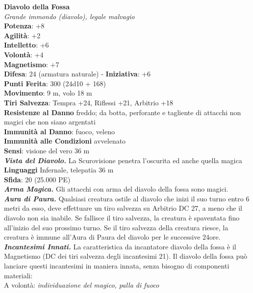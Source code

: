 \begin{multicols}{2}
\medskip\textbf{Diavolo della Fossa}\\
\emph{Grande immondo (diavolo), legale malvagio}\\
\textbf{Potenza}: +8\\
\textbf{Agilità}: +2\\
\textbf{Intelletto}: +6\\
\textbf{Volontà}: +4\\
\textbf{Magnetismo}: +7\\
\textbf{Difesa}: 24 (armatura naturale) - \textbf{Iniziativa}: +6\\
\textbf{Punti Ferita}: 300 (24d10 + 168)\\
\textbf{Movimento}: 9 m, volo 18 m\\
\textbf{Tiri Salvezza}: Tempra +24, Riflessi +21, Arbitrio +18\\
\textbf{Resistenze al Danno} freddo; da botta, perforante e tagliente di attacchi non magici che non siano argentati\\
\textbf{Immunità al Danno}: fuoco, veleno\\
\textbf{Immunità alle Condizioni} avvelenato\\
\textbf{Sensi}: visione del vero 36 m\\
\emph{\textbf{Vista del Diavolo.}} La Scurovisione penetra l'oscurita ed anche quella magica\\
\textbf{Linguaggi} Infernale, telepatia 36 m\\ 
\textbf{Sfida}: 20 (25.000 PE)\smallskip\\
\emph{\textbf{Arma Magica.}} Gli attacchi con arma del diavolo della fossa sono magici.\\
\emph{\textbf{Aura di Paura.}} Qualsiasi creatura ostile al diavolo che inizi il suo turno entro 6 metri da esso, deve effettuare un tiro salvezza su Arbitrio DC  27, a meno che il diavolo non sia inabile. Se fallisce il tiro salvezza, la creatura è spaventata fino all'inizio del suo prossimo turno. Se il tiro salvezza della creatura riesce, la creatura è immune all'Aura di Paura del diavolo per le successive 24ore. \\
\emph{\textbf{Incantesimi Innati.}} La caratteristica da incantatore diavolo della fossa è il Magnetismo (DC dei tiri salvezza degli incantesimi 21). Il diavolo della fossa può lanciare questi incantesimi in maniera innata, senza bisogno di componenti materiali:\\
A volontà: \emph{individuazione del magico, palla di fuoco}\\

\end{multicols}
